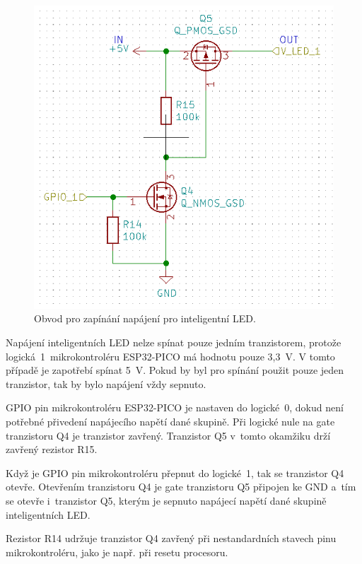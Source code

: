   \begin{figure}[!h]
    \begin{center}
      \includegraphics[scale=0.7]{obrazky/Zapinani_napajeni_LED.png}
    \end{center}
    \caption[Obvod pro zapínání napájení pro inteligentní LED]{Obvod pro zapínání napájení pro inteligentní LED.}
  \end{figure}

  Napájení inteligentních LED nelze spínat pouze jedním tranzistorem, protože logická~1~mikrokontroléru ESP32-PICO má hodnotu pouze 3,3~V. 
  V tomto případě je zapotřebí spínat 5~V. Pokud by byl pro spínání použit pouze jeden tranzistor, tak by bylo napájení vždy sepnuto.

  GPIO pin mikrokontroléru ESP32-PICO je nastaven do logické~0, dokud není potřebné přivedení napájecího napětí dané skupině. 
  Při logické nule na gate 
  tranzistoru Q4 je tranzistor zavřený. Tranzistor Q5 v~tomto okamžiku drží zavřený rezistor R15.

  Když je GPIO pin mikrokontroléru přepnut do logické~1, tak se tranzistor Q4 otevře. Otevřením tranzistoru Q4 je gate tranzistoru Q5 
  připojen ke GND a~tím se otevře i~tranzistor Q5, kterým je sepnuto napájecí napětí dané skupině inteligentních LED.

  Rezistor R14 udržuje tranzistor Q4 zavřený při nestandardních stavech pinu mikrokontroléru, jako je např. při resetu procesoru.

